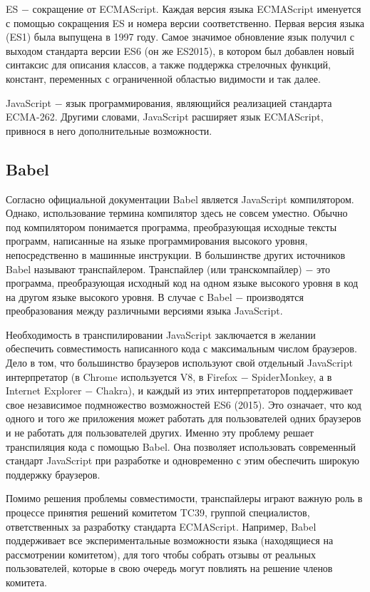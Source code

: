 \documentclass[14pt, a4paper]{article}
\begin{document}
ES $-$ сокращение от ECMAScript. Каждая версия языка ECMAScript именуется с помощью сокращения ES и 
номера версии соответственно. Первая версия языка (ES1)  была выпущена в 1997 году. Самое значимое 
обновление язык получил с выходом стандарта версии ES6 (он же ES2015), в котором был добавлен новый 
синтаксис для описания классов, а также поддержка стрелочных функций, констант,  переменных с ограниченной областью 
видимости и так далее.

JavaScript $-$ язык программирования, являющийся реализацией стандарта ECMA-262. Другими словами, 
JavaScript расширяет язык ECMAScript, привнося в него дополнительные возможности.

\subsection{Babel}
Согласно официальной документации \cite{documentation} Babel является JavaScript компилятором. Однако, 
использование термина компилятор здесь не совсем уместно. Обычно под компилятором понимается программа, 
преобразующая исходные тексты программ, написанные на языке программирования высокого уровня, 
непосредственно в машинные инструкции. В большинстве других источников Babel называют транспайлером. 
Транспайлер (или транскомпайлер) $-$ это программа, преобразующая исходный код на одном языке высокого 
уровня в код на другом языке высокого уровня. В случае с Babel $-$ производятся преобразования между 
различными версиями языка JavaScript.

Необходимость в транспилировании JavaScript заключается в желании обеспечить совместимость написанного 
кода с максимальным числом браузеров. Дело в том, что большинство браузеров используют свой отдельный 
JavaScript интерпретатор (в Chrome используется V8, в Firefox $-$ SpiderMonkey, а в Internet Explorer $-$ Chakra), 
и каждый из этих интерпретаторов поддерживает свое независимое подмножество возможностей ES6 (2015). Это 
означает, что код одного и того же приложения может работать для пользователей одних браузеров и не 
работать для пользователей других. Именно эту проблему решает транспиляция кода с помощью Babel. Она 
позволяет использовать современный стандарт JavaScript при разработке и одновременно с этим обеспечить 
широкую поддержку браузеров.

Помимо решения проблемы совместимости, транспайлеры играют важную роль в процессе принятия решений 
комитетом TC39, группой специалистов, ответственных за разработку стандарта ECMAScript. Например, 
Babel поддерживает все экспериментальные возможности языка (находящиеся на рассмотрении комитетом), 
для того чтобы собрать отзывы от реальных пользователей, которые в свою очередь могут повлиять на 
решение членов комитета.
\end{document}
